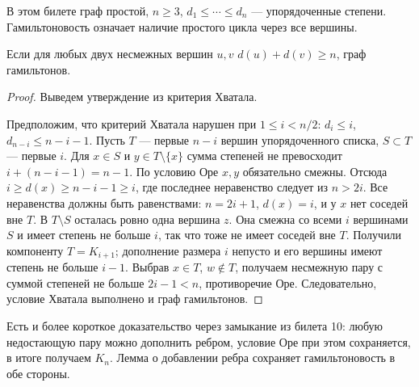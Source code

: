 \begin{definition}
В этом билете граф простой, \(n\ge3\),
\(d_1\le\cdots\le d_n\) — упорядоченные степени.
Гамильтоновость означает наличие простого цикла через все вершины.
\end{definition}
\begin{theorem}[Оре]
Если для любых двух несмежных вершин \(u,v\)
\(d(u)+d(v)\ge n\), граф гамильтонов.
\end{theorem}
\begin{proof}
Выведем утверждение из критерия Хватала.


Предположим, что критерий Хватала нарушен при \(1\le i<n/2\):
\(d_i\le i\), \(d_{n-i}\le n-i-1\). Пусть \(T\) — первые \(n-i\)
вершин упорядоченного списка, \(S\subset T\) — первые \(i\).
Для \(x\in S\) и \(y\in T\setminus\{x\}\) сумма степеней не превосходит
\(i+(n-i-1)=n-1\). По условию Оре \(x,y\) обязательно смежны.
Отсюда \(i\ge d(x)\ge n-i-1\ge i\), где последнее неравенство
следует из \(n>2i\). Все неравенства должны быть равенствами:
\(n=2i+1\), \(d(x)=i\), и у \(x\) нет соседей вне \(T\).
В \(T\setminus S\) осталась ровно одна вершина \(z\).
Она смежна со всеми \(i\) вершинами \(S\) и имеет степень не больше \(i\),
так что тоже не имеет соседей вне \(T\).
Получили компоненту \(T=K_{i+1}\); дополнение размера \(i\) непусто
и его вершины имеют степень не больше \(i-1\).
Выбрав \(x\in T\), \(w\notin T\), получаем несмежную пару с суммой
степеней не больше \(2i-1<n\), противоречие Оре.
Следовательно, условие Хватала выполнено и граф гамильтонов.
\end{proof}


Есть и более короткое доказательство через замыкание из билета 10:
любую недостающую пару можно дополнить ребром, условие Оре при этом
сохраняется, в итоге получаем \(K_n\). Лемма о добавлении ребра
сохраняет гамильтоновость в обе стороны.


